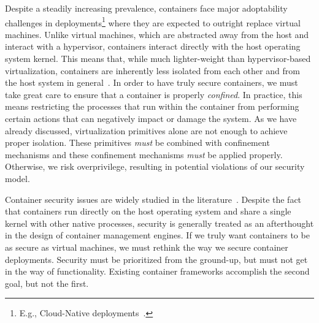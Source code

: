 Despite a steadily increasing prevalence, containers face major adoptability challenges in
deployments\footnote{E.g., Cloud-Native deployments~\cite{brady2020_docker_cloud}.} where
they are expected to outright replace virtual machines. Unlike virtual machines, which are
abstracted away from the host and interact with a hypervisor, containers interact directly
with the host operating system kernel. This means that, while much lighter-weight than
hypervisor-based virtualization, containers are inherently less isolated from each other
and from the host system in general~\cite{sultan2019_container_security,
lin2018_container_security, mullinix2020_security_measures, bui2015_docker_analysis}.  In
order to have truly secure containers, we must take great care to ensure that a container
is properly \textit{confined}. In practice, this means restricting the processes that run
within the container from performing certain actions that can negatively impact or damage
the system.  As we have already discussed, virtualization primitives alone are not enough
to achieve proper isolation. These primitives \textit{must} be combined with confinement
mechanisms and these confinement mechanisms \textit{must} be applied properly. Otherwise,
we risk overprivilege, resulting in potential violations of our security model.

Container security issues are widely studied in the
literature~\cite{sultan2019_container_security, lin2018_container_security,
mp2016_hardening, mullinix2020_security_measures, bui2015_docker_analysis}.  Despite the
fact that containers run directly on the host operating system and share a single kernel
with other native processes, security is generally treated as an afterthought in the
design of container management engines. If we truly want containers to be as secure as
virtual machines, we must rethink the way we secure container deployments. Security must
be prioritized from the ground-up, but must not get in the way of functionality. Existing
container frameworks accomplish the second goal, but not the first.

